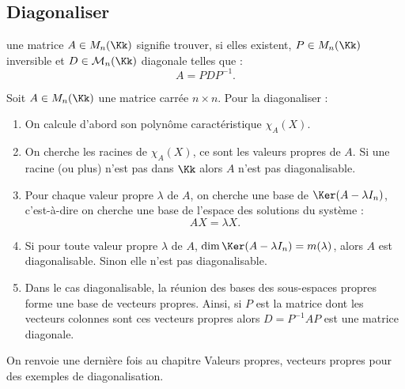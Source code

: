 \documentclass[12pt, class=report,crop=false]{standalone}
\begin{document}
\subsection{Diagonaliser}

 une matrice $A \in M_n(\Kk)$ signifie trouver, 
si elles existent, $P \in M_n(\Kk)$ inversible et $D \in\mathcal{M}_n(\Kk)$ diagonale telles que :
\[A = PDP^{-1} .\]

\bigskip

Soit $A \in M_n(\Kk)$ une matrice carrée $n \times n$. 
Pour la diagonaliser :
\begin{enumerate}
  \item On calcule d'abord son polynôme caractéristique $\chi_A(X)$.

  \item On cherche les racines de $\chi_A(X)$, ce sont les valeurs propres de $A$.
  Si une racine (ou plus) n'est pas dans $\Kk$ alors $A$ n'est pas diagonalisable.
  
  \item Pour chaque valeur propre $\lambda$ de $A$, on cherche une base de $\Ker(A-\lambda I_n)$, 
  c'est-à-dire on cherche une base de l'espace des solutions du système :
\[AX = \lambda X.\]

  \item Si pour toute valeur propre $\lambda$ de $A$, $\dim \Ker (A -\lambda I_n) = m(\lambda)$, alors 
  $A$ est diagonalisable. Sinon elle n'est pas diagonalisable.
  
  \item Dans le cas diagonalisable, la réunion des bases des sous-espaces propres 
  forme une base de vecteurs propres. Ainsi, si $P$ est la matrice dont les vecteurs 
  colonnes sont ces vecteurs propres alors $D=P^{-1}AP$ est une matrice diagonale. 
 \end{enumerate} 


On renvoie une dernière fois au chapitre \og{}Valeurs propres, vecteurs propres\fg{} pour des exemples de diagonalisation.
\end{document}

